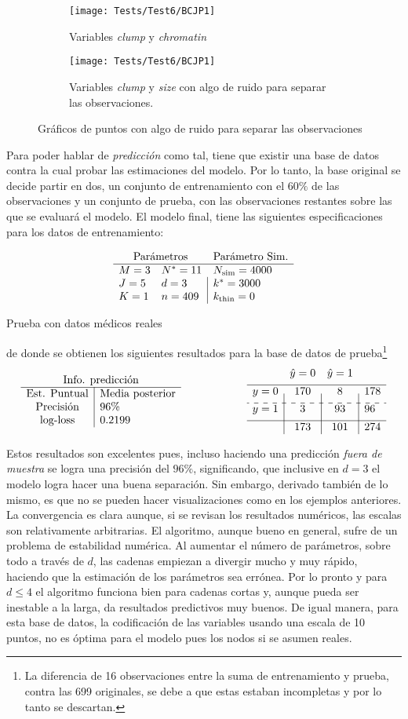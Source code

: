 \documentclass[../Main/Main.tex]{subfiles}
\begin{document}
\begin{figure}[h]
        \centering
        \begin{subfigure}[b]{0.45\textwidth}
            \centering
            \texttt{[image: Tests/Test6/BCJP1]}
            \caption{Variables \textit{clump} y \textit{chromatin}}
			\label{fig:BCJP1}
        \end{subfigure}
        \hfill
        \begin{subfigure}[b]{0.45\textwidth}  
            \centering 
            \texttt{[image: Tests/Test6/BCJP1]}
            \caption{Variables \textit{clump} y \textit{size} con algo de ruido para separar las observaciones.}
			\label{fig:BCJP2}
        \end{subfigure}
		\caption{Gráficos de puntos con algo de ruido para separar las observaciones}
		\label{fig:BCJP}
\end{figure}
Para poder hablar de \textit{predicción} como tal, tiene que existir una base de datos contra la cual probar las estimaciones del modelo. Por lo tanto, la base original se decide partir en dos, un conjunto de entrenamiento con el $60\%$ de las observaciones y un conjunto de prueba, con las observaciones restantes sobre las que se evaluará el modelo. El modelo final, tiene las siguientes especificaciones para los datos de entrenamiento:
\begin{table}[H]
$$\paramsmod{3}{5}{1}{11}{3}{409}{4000}{3000}{0}$$
\caption*{Prueba con datos médicos reales}
\label{ej:BC}
\end{table}
de donde se obtienen los siguientes resultados para la base de datos de prueba\footnote{La diferencia de 16 observaciones entre la suma de entrenamiento y prueba, contra las 699 originales, se debe a que estas estaban incompletas y por lo tanto se descartan.}
\begin{align*}
\resultados{\text{Media posterior}}{96}{0.2199}
\qquad\qquad\qquad
\matconf{170}{8}{178}{3}{93}{96}{173}{101}{274}
\end{align*}

Estos resultados son excelentes pues, incluso haciendo una predicción \textit{fuera de muestra} se logra una precisión del $96\%$, significando, que inclusive en $d=3$ el modelo logra hacer una buena separación. Sin embargo, derivado también de lo mismo, es que no se pueden hacer visualizaciones como en los ejemplos anteriores. La convergencia es clara aunque, si se revisan los resultados numéricos, las escalas son relativamente arbitrarias. El algoritmo, aunque bueno en general, sufre de un problema de estabilidad numérica. Al aumentar el número de parámetros, sobre todo a través de $d$, las cadenas empiezan a divergir mucho y muy rápido, haciendo que la estimación de los parámetros sea errónea. Por lo pronto y para $d\leq4$ el algoritmo funciona bien para cadenas cortas y, aunque pueda ser inestable a la larga, da resultados predictivos muy buenos. De igual manera, para esta base de datos, la codificación de las variables usando una escala de 10 puntos, no es óptima para el modelo pues los nodos si se asumen reales. 
\end{document}
